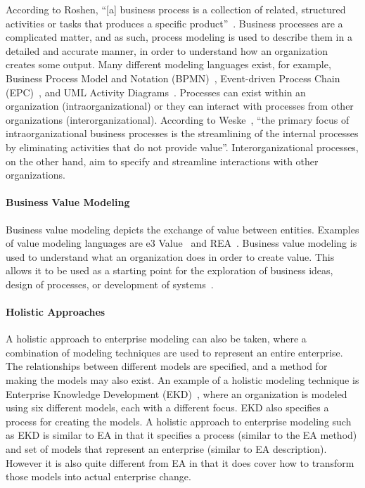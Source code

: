 According to Roshen, ``[a] business process is a collection of related, structured activities or tasks that produces a specific product''~\cite{roshen2009soa}. Business processes are a complicated matter, and as such, process modeling is used to describe them in a detailed and accurate manner, in order to understand how an organization creates some output. Many different modeling languages exist, for example, Business Process Model and Notation (BPMN)~\cite{model2011notation}, Event-driven Process Chain (EPC)~\cite[Ch. 6]{scheer2005process}, and UML Activity Diagrams~\cite{uml241}. Processes can exist within an organization (intraorganizational) or they can interact with processes from other organizations (interorganizational). According to Weske~\cite{weske2012business}, ``the primary focus of intraorganizational business processes is the streamlining of the internal processes by eliminating activities that do not provide value''. Interorganizational processes, on the other hand, aim to specify and streamline interactions with other organizations. 

\paragraph*{Business Value Modeling}

Business value modeling depicts the exchange of value between entities. Examples of value modeling languages are e3 Value~\cite{Gordijn2001e3value} and REA~\cite{pavel2006model}. Business value modeling is used to understand what an organization does in order to create value. This allows it to be used as a starting point for the exploration of business ideas, design of processes, or development of systems~\cite{johannesson2011lecture}.

\paragraph*{Holistic Approaches}

A holistic approach to enterprise modeling can also be taken, where a combination of modeling techniques are used to represent an entire enterprise. The relationships between different models are specified, and a method for making the models may also exist. An example of a holistic modeling technique is Enterprise Knowledge Development (EKD)~\cite{stirna2007ten,bubenko2001user}, where an organization is modeled using six different models, each with a different focus. EKD also specifies a process for creating the models. A holistic approach to enterprise modeling such as EKD is similar to EA in that it specifies a process (similar to the EA method) and set of models that represent an enterprise (similar to EA description). However it is also quite different from EA in that it does cover how to transform those models into actual enterprise change.


